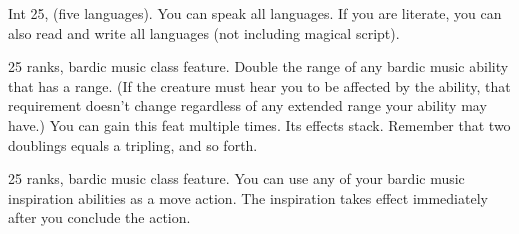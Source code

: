 {Int 25,  (five languages).}
{You can speak all languages. If you are literate, you can also read and write all languages (not including magical script).}

{}
{ 25 ranks, bardic music class feature.}
{Double the range of any bardic music ability that has a range. (If the creature must hear you to be affected by the ability, that requirement doesn't change regardless of any extended range your ability may have.)}
{}{You can gain this feat multiple times. Its effects stack. Remember that two doublings equals a tripling, and so forth.}

{ 25 ranks, bardic music class feature.}
{You can use any of your bardic music inspiration abilities as a move action. The inspiration takes effect immediately after you conclude the action.}
